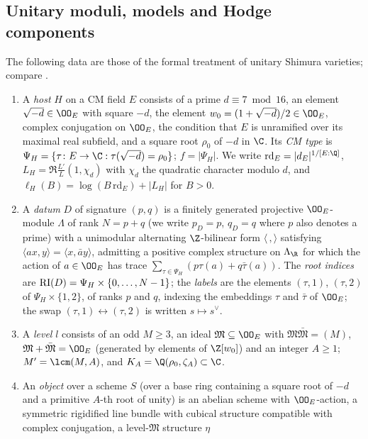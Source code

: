 \subsection{Unitary moduli, models and Hodge components}\label{pf:towergeo:sec-unitary}

The following data are those of the formal treatment of unitary Shimura varieties; compare
\cite{Kottwitz1992,Lan2013}.
\begin{enumerate}[label=(\alph*)]
\item A \emph{host} $H$ on a CM field $E$ consists of a prime $d\equiv7\bmod16$, an element
  $\sqrt{-d}\in\OO_E$ with square $-d$, the element $w_0=(1+\sqrt{-d})/2\in\OO_E$, complex conjugation on
  $\OO_E$, the condition that $E$ is unramified over its maximal real subfield, and a square root
  $\rho_0$ of $-d$ in $\C$. Its \emph{CM type} is $\Psi_H=\{\tau\colon E\to\C:\tau(\sqrt{-d})=\rho_0\}$;
  $f=|\Psi_H|$. We write $\mathrm{rd}_E=|d_E|^{1/[E:\Q]}$, $L_H=\Re\frac{L'}{L}(1,\chi_d)$ with $\chi_d$
  the quadratic character modulo $d$, and $\ell_H(B)=\log(B\,\mathrm{rd}_E)+|L_H|$ for $B>0$.
\item A \emph{datum} $D$ of signature $(p,q)$ is a finitely generated projective $\OO_E$-module $\Lambda$
  of rank $N=p+q$ (we write $p_D=p$, $q_D=q$ where $p$ also denotes a prime) with a unimodular alternating $\Z$-bilinear form $\langle\,,\rangle$ satisfying
  $\langle ax,y\rangle=\langle x,\bar ay\rangle$, admitting a positive complex structure on
  $\Lambda_\R$ for which the action of $a\in\OO_E$ has trace $\sum_{\tau\in\Psi_H}(p\tau(a)+q\bar\tau(a))$.
  The \emph{root indices} are $\mathrm{RI}(D)=\Psi_H\times\{0,\dots,N-1\}$; the \emph{labels} are the
  elements $(\tau,1)$, $(\tau,2)$ of $\Psi_H\times\{1,2\}$, of ranks $p$ and $q$, indexing the embeddings
  $\tau$ and $\bar\tau$ of $\OO_E$; the swap $(\tau,1)\leftrightarrow(\tau,2)$ is written $s\mapsto s^\vee$.
\item A \emph{level} $l$ consists of an odd $M\ge3$, an ideal $\mathfrak M\subseteq\OO_E$ with
  $\mathfrak M\bar{\mathfrak M}=(M)$, $\mathfrak M+\bar{\mathfrak M}=\OO_E$ (generated by elements of
  $\Z[w_0]$) and an integer $A\ge1$; $M'=\lcm(M,A)$, and $K_A=\Q(\rho_0,\zeta_A)\subset\C$.
\item An \emph{object} over a scheme $S$ (over a base ring containing a square root of $-d$ and a
  primitive $A$-th root of unity) is an abelian scheme with $\OO_E$-action, a symmetric rigidified line
  bundle with cubical structure compatible with complex conjugation, a level-$\mathfrak M$ structure $\eta$

\end{enumerate}
